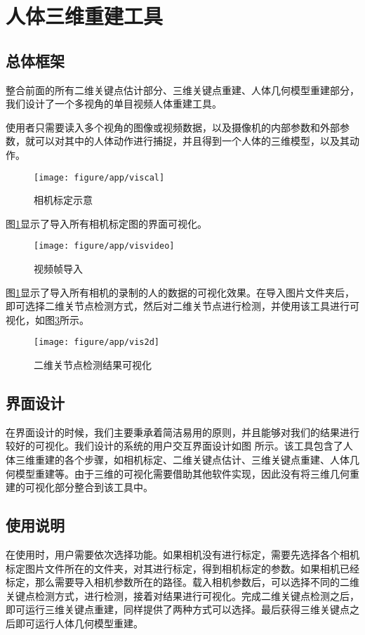\newpage
\section{人体三维重建工具}

\subsection{总体框架}
整合前面的所有二维关键点估计部分、三维关键点重建、人体几何模型重建部分，我们设计了一个多视角的单目视频人体重建工具。%

使用者只需要读入多个视角的图像或视频数据，以及摄像机的内部参数和外部参数，就可以对其中的人体动作进行捕捉，并且得到一个人体的三维模型，以及其动作。
\begin{figure}[htbp]
    \centering
    \texttt{[image: figure/app/viscal]}
    \caption{\label{fig:appcal} 相机标定示意}
\end{figure}
图\ref{fig:appcal}显示了导入所有相机标定图的界面可视化。

\begin{figure}[htbp]
    \centering
    \texttt{[image: figure/app/visvideo]}
    \caption{\label{fig:appvideo} 视频帧导入}
\end{figure}
图\ref{fig:appcal}显示了导入所有相机的录制的人的数据的可视化效果。在导入图片文件夹后，即可选择二维关节点检测方式，然后对二维关节点进行检测，并使用该工具进行可视化，如图\ref{fig:app2d}所示。
\begin{figure}[htbp]
    \centering
    \texttt{[image: figure/app/vis2d]}
    \caption{\label{fig:app2d} 二维关节点检测结果可视化}
\end{figure}
 

\subsection{界面设计}
在界面设计的时候，我们主要秉承着简洁易用的原则，并且能够对我们的结果进行较好的可视化。我们设计的系统的用户交互界面设计如图 所示。该工具包含了人体三维重建的各个步骤，如相机标定、二维关键点估计、三维关键点重建、人体几何模型重建等。由于三维的可视化需要借助其他软件实现，因此没有将三维几何重建的可视化部分整合到该工具中。

\subsection{使用说明}
在使用时，用户需要依次选择功能。如果相机没有进行标定，需要先选择各个相机标定图片文件所在的文件夹，对其进行标定，得到相机标定的参数。如果相机已经标定，那么需要导入相机参数所在的路径。载入相机参数后，可以选择不同的二维关键点检测方式，进行检测，接着对结果进行可视化。完成二维关键点检测之后，即可运行三维关键点重建，同样提供了两种方式可以选择。最后获得三维关键点之后即可运行人体几何模型重建。

